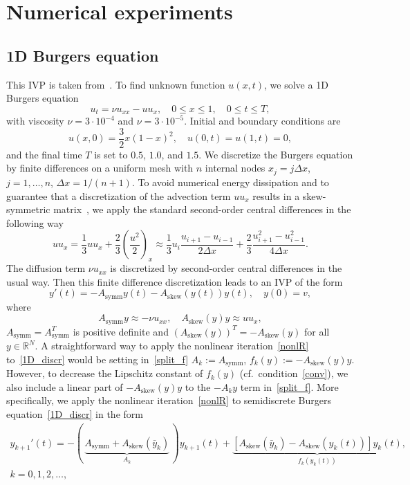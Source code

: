 \documentclass[sn-aps]{sn-jnl}
\theoremstyle{thmstyleone}%
\theoremstyle{thmstyletwo}%
\theoremstyle{thmstylethree}%
\newcommand{\leqs}{\leqslant}
\newcommand{\Rr}{\mathbb{R}}
\newcommand{\Asymm}{A_{\mathrm{symm}}}
\newcommand{\Askew}{A_{\mathrm{skew}}}
\begin{document}
\section{Numerical experiments}

\subsection{1D Burgers equation}
\label{s:num_exp1D}
This IVP is taken from~\cite[Ch.~IV.10]{ODE2(HW)}.
To find unknown function $u(x,t)$, we solve a 1D Burgers equation 
$$
u_t = \nu u_{xx} -uu_x , \quad 0\leqs x\leqs 1, 
\quad 0\leqs t\leqs T, 
$$
with viscosity $\nu = 3\cdot 10^{-4}$ and  $\nu = 3\cdot 10^{-5}$.
Initial and boundary conditions are
$$
u(x,0) = \frac32 x(1-x)^2, \quad u(0,t)=u(1,t)=0,
$$
and the final time $T$ is set to $0.5$, $1.0$, and $1.5$.
We discretize the Burgers equation by finite differences on a
uniform mesh with $n$ internal nodes $x_j=j\Delta x$, $j=1,\dots,n$,
$\Delta x=1/(n+1)$.  
To avoid numerical energy dissipation and to guarantee that a discretization of 
the advection term $uu_x$
results in  a skew-symmetric matrix~\cite{Krukier79}, we apply the standard second-order
central differences in the following way
$$
uu_x = \frac13 uu_x + \frac23 \left(\frac{u^2}2\right)_x\approx
\frac13 u_i\frac{u_{i+1}-u_{i-1}}{2\Delta x} + \frac23
\frac{u_{i+1}^2-u_{i-1}^2}{4\Delta x}.
$$
The diffusion term $\nu u_{xx}$ is discretized by second-order central differences
in the usual way.  Then this finite difference discretization
leads to an IVP of the form
\begin{equation}
\label{1D_discr}
y'(t) = -\Asymm y(t) - \Askew (y(t))y(t), \quad y(0)=v,  
\end{equation}
where 
$$
\Asymm y\approx -\nu u_{xx}, \quad \Askew (y)y \approx uu_x,
$$ 
$\Asymm =\Asymm^T$ is positive definite and $(\Askew (y))^T=-\Askew (y)$ for all $y\in\Rr^N$.
A straightforward way to apply the nonlinear iteration~\eqref{nonlR} to~\eqref{1D_discr}
would be setting in~\eqref{split_f} $A_k:=\Asymm $, $f_k(y):=-\Askew (y)y$.
However, to decrease the Lipschitz constant of $f_k(y)$ (cf.\ condition~\eqref{conv}), we also
include a linear part of $-\Askew (y)y$ to the $-A_ky$ term in~\eqref{split_f}.
More specifically, we apply the nonlinear iteration~\eqref{nonlR} to semidiscrete
Burgers equation~\eqref{1D_discr} in the form
\begin{equation}
\label{nonlR_1D}  
\begin{aligned}
y_{k+1}'(t) =
- (\,\underbrace{\Asymm  + \Askew (\bar{y}_k)}_{\displaystyle A_k}\,)y_{k+1}(t)
+ \underbrace{\left[\Askew (\bar{y}_k) - \Askew (y_k(t))\right]y_k(t)}_{\displaystyle f_k(y_k(t))},
\\
k=0,1,2,\dots,
\end{aligned}
\end{equation}
\end{document}
